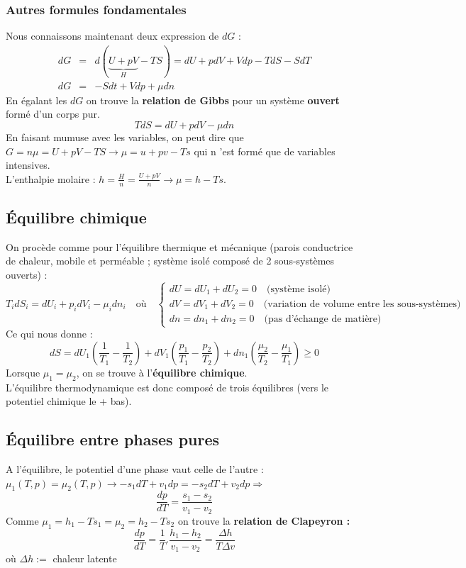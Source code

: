 \documentclass[11pt, a4paper, openany]{book}
\begin{document}
\subsubsection{Autres formules fondamentales}
Nous connaissons maintenant deux expression de $dG$ :
\begin{eqnarray}
dG &=& d(\underbrace{U + pV}_H - TS) = dU + pdV + Vdp - TdS - SdT\\
dG &=& -Sdt + Vdp + \mu dn
\end{eqnarray}
En égalant les $dG$ on trouve la \textbf{relation de Gibbs} pour un système \textbf{ouvert} formé d'un corps pur.
\begin{equation}
TdS = dU + pdV - \mu dn
\end{equation}
En faisant mumuse avec les variables, on peut dire que $G = n\mu = U + pV - TS \rightarrow \mu = u + pv - Ts$ qui n 'est formé que de variables intensives.\\
L'enthalpie molaire : $h = \frac{H}{n} = \frac{U + pV}{n} \rightarrow \mu = h - Ts$.

\subsection{Équilibre chimique}
On procède comme pour l'équilibre thermique et mécanique (parois conductrice de chaleur, mobile et perméable ; système isolé composé de 2 sous-systèmes ouverts) :
\begin{equation}
T_idS_i = dU_i + p_idV_i - \mu_idn_i\quad\text{où}\quad\left\{\begin{array}{l}
dU = dU_1 + dU_2 = 0\quad\text{(système isolé)}\\
dV = dV_1 + dV_2 = 0\quad\text{(variation de volume entre les sous-systèmes)}\\
dn = dn_1 + dn_2 = 0\quad\text{(pas d'échange de matière)}
\end{array}\right.
\end{equation}
Ce qui nous donne : 
\begin{equation}
dS = dU_1\left(\frac{1}{T_1}-\frac{1}{T_2}\right) + dV_1 \left(\frac{p_1}{T_1}-\frac{p_2}{T_2}\right) + dn_1\left(\frac{\mu_2}{T_2}-\frac{\mu_1}{T_1}\right) \geq 0
\end{equation}
Lorsque $\mu_1 = \mu_2$, on se trouve à l'\textbf{équilibre chimique}.\\
L'équilibre thermodynamique est donc composé de trois équilibres (vers le potentiel chimique le + bas).

\subsection{Équilibre entre phases pures}
A l'équilibre, le potentiel d'une phase vaut celle de l'autre : $\mu_1(T, p) = \mu_2(T,p) \rightarrow -s_1dT + v_1dp = -s_2dT + v_2dp \Rightarrow$
\begin{equation}
\frac{dp}{dT} = \frac{s_1 - s_2}{v_1 - v_2}
\end{equation}
Comme $\mu_1 = h_1 - Ts_1 = \mu_2 = h_2 - Ts_2$ on trouve la \textbf{relation de Clapeyron :}
\begin{equation}
\frac{dp}{dT} = \frac{1}{T}.\frac{h_1 - h_2}{v_1 - v_2} = \frac{\Delta h}{T\Delta v}
\end{equation}
où $\Delta h:=$ chaleur latente
\end{document}
